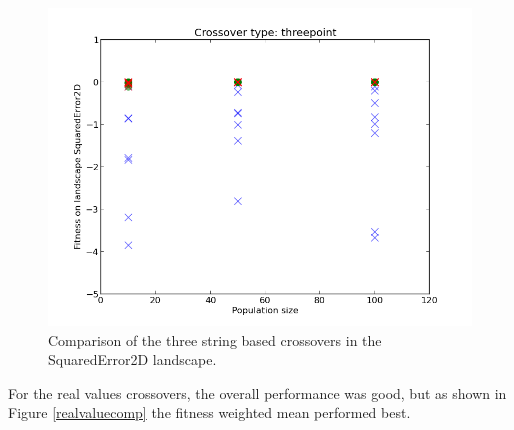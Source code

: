 \documentclass{scrartcl}
\begin{document}
\begin{figure}[H]
\begin{minipage}{.33\textwidth}
\end{minipage}
\begin{minipage}{.33\textwidth}
  \centering
  \includegraphics[width=.8\linewidth]{img/ex2/threepoint-SquaredError2D-pop.png}
\end{minipage}
\caption{Comparison of the three string based crossovers in the SquaredError2D landscape.}
\label{fig:stringcomp}
\end{figure}

For the real values crossovers, the overall performance was good, but as shown in Figure \ref{realvaluecomp} the fitness weighted mean performed best. 
\end{document}
